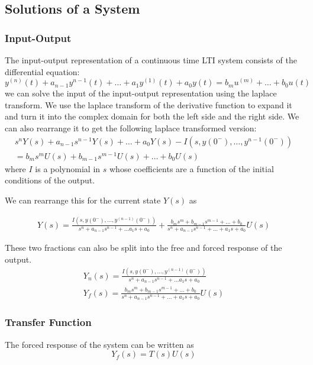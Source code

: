 \documentclass[11pt]{article}
\begin{document}
\subsection{Solutions of a System}
\subsubsection{Input-Output}
The input-output representation of a continuous time LTI system consists of the differential equation:
\begin{equation}
  y^{(n)} (t) + a_{n-1} y^{n-1}(t) + \dots + a_1 y^{(1)}(t) + a_0 y(t) = b_m u^{(m)} + \dots + b_0 u(t)
\end{equation}
we can solve the input of the input-output representation using the laplace transform.
We use the laplace transform of the derivative function to expand it and turn it into the complex domain for both the left side and the right side.
We can also rearrange it to get the following laplace transformed version:
\begin{gather}
  s^n Y(s) + a_{n-1} s^{n-1} Y(s) + \dots + a_0 Y(s) - I(s,y(0^{-}), \dots, y^{n-1}(0^-)) \\ =
  b_m s^m U(s) + b_{m-1} s^{m-1} U(s) + \dots + b_0 U(s)
\end{gather}
where $I$ is a polynomial in $s$ whose coefficients are a function of the initial conditions of the output.

We can rearrange this for the current state $Y(s)$ as

\begin{gather}
  Y(s) = \frac{I(s,y(0^-), \dots, y^{(n-1)}(0^-))}{s^n + a_{n-1} s^{n-1} + \dots a_1s + a_0} + \frac{b_m s^m + b_{m-1} s^{m-1} + \dots + b_0}{s^n + a_{n-1} s^{n-1} + \dots + a_1s + a_0} U(s)
\end{gather}

These two fractions can also be split into the free and forced response of the output.
\begin{gather}
  Y_n(s) = \frac{I(s,y(0^-), \dots, y^{(n-1)}(0^-))}{s^n + a_{n-1} s^{n-1} + \dots a_1s + a_0} \\
  Y_f(s) = \frac{b_m s^m + b_{m-1} s^{m-1} + \dots + b_0}{s^n + a_{n-1} s^{n-1} + \dots + a_1s + a_0} U(s)
\end{gather}

\subsubsection{Transfer Function}
The forced response of the system can be written as 
\begin{equation}
  Y_f(s) = T(s) U(s)
\end{equation}
\end{document}
